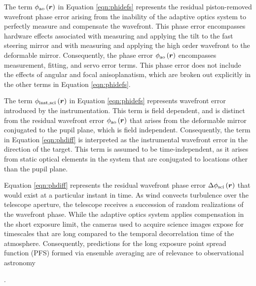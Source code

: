 The term $\phi_{\rm ao}\left(\boldsymbol{r}\right)$ in Equation
\ref{eqn:phidefs} represents the residual piston-removed wavefront phase
error arising from the inability of the adaptive optics system to
perfectly measure and compensate the wavefront.  This phase error
encompasses hardware effects associated with measuring and applying
the tilt to the fast steering mirror and with measuring and applying
the high order wavefront to the deformable mirror.  Consequently, the
phase error $\phi_{\rm ao}\left(\boldsymbol{r}\right)$ encompasses
measurement, fitting, and servo error terms.  This phase error does
not include the effects of angular and focal anisoplanatism, which
are broken out explicitly in the other terms in Equation
\ref{eqn:phidefs}.

The term $\phi_{\rm inst,sci}\left(\boldsymbol{r}\right)$ in Equation
\ref{eqn:phidefs} represents wavefront error introduced by the
instrumentation.  This term is field dependent, and is distinct from
the residual wavefront error $\phi_{\rm
  ao}\left(\boldsymbol{r}\right)$ that arises from the deformable
mirror conjugated to the pupil plane, which is field independent.
Consequently, the term in Equation \ref{eqn:phdiff} is interpreted as the
instrumental wavefront error in the direction of the target.  This
term is assumed to be time-independent, as it arises from static
optical elements in the system that are conjugated to locations other
than the pupil plane.  

Equation \ref{eqn:phdiff} represents the residual wavefront phase error
$\Delta\phi_{\rm sci}\left(\boldsymbol{r}\right)$ that would exist at
a particular instant in time.  As wind convects turbulence over the
telescope aperture, the telescope receives a succession of random
realizations of the wavefront phase.  While the adaptive optics system
applies compensation in the short exposure limit, the cameras used to
acquire science images expose for timescales that are long compared to
the temporal decorrelation time of the atmosphere.  
Consequently, predictions for the
long exposure point spread function (PFS) formed via ensemble averaging are
of relevance to observational astronomy
\begin{notes}
[CITE].
\end{notes}

